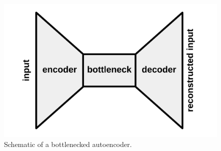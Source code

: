 \begin{figure}
  \includegraphics[width=\linewidth]{img/bottleneck}
  \caption{
    Schematic of a bottlenecked autoencoder.
  }\label{fig:bottleneck}
\end{figure}
